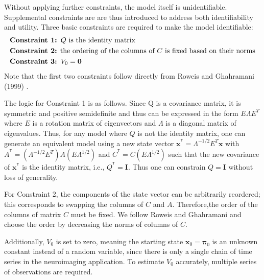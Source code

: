 \documentclass[fleqn]{article}
\newcommand{\T}{^{\ensuremath{\mathsf{T}}}}           %
\begin{document}
Without applying further constraints, the model itself is unidentifiable. Supplemental constraints are are thus introduced to address both identifiability and utility. Three basic constraints are required to make the model identifiable:
\vspace*{-3mm}
\begin{equation*}\label{eq:constraints1}
\begin{aligned}
&\textbf{Constraint 1: }Q \text{ is the identity matrix}\\
&\text{\textbf{Constraint 2:} the ordering of the columns of } C \text{ is fixed based on their norms}\\
&\textbf{Constraint 3: } V_0=\mathbf{0}
\end{aligned}
\end{equation*}
Note that the first two constraints follow directly from Roweis and Ghahramani (1999) \cite{roweis1999unifying}.

The logic for Constraint 1 is as follows. Since Q is a covariance matrix, it is symmetric and positive semidefinite and thus can be expressed in the form $E\Lambda E^T$ where $E$ is a rotation matrix of eigenvectors and $\Lambda$ is a diagonal matrix of eigenvalues. Thus, for any model where $Q$ is not the identity matrix, one can generate an equivalent model using a new state vector $\mathbf{x}^{\T}=\Lambda^{-1/2} E^T \mathbf{x}$ with $A^{\T}=(\Lambda^{-1/2}E^T)A(E\Lambda^{1/2})$ and $C^{\T}=C(E\Lambda^{1/2})$ such that the new covariance of $\mathbf{x}^{\T}$ is the identity matrix, i.e., $Q^{\T}=\mathbf{I}$. Thus one can constrain $Q=\mathbf{I}$ without loss of generality.

For Constraint 2, the components of the state vector can be arbitrarily reordered; this corresponds to swapping the columns of $C$ and $A$. Therefore,the order of the columns of matrix $C$ must be fixed. We follow Roweis and Ghahramani and choose the order by decreasing the norms of columns of $C$.

Additionally, $V_0$ is set to zero, meaning the starting state $\mathbf{x}_0=\mathbf{\pi}_0$ is an unknown constant instead of a random variable, since there is only a single chain of time series in the neuroimaging application. To estimate $V_0$ accurately, multiple series of observations are required.
\end{document}
